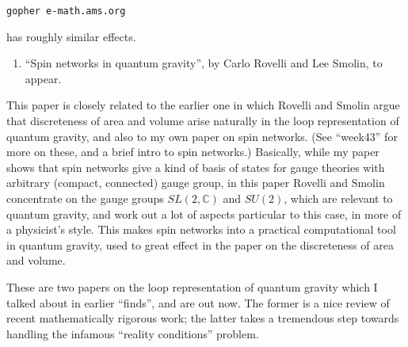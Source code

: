\documentclass{article}
\def\tightlist{}
\renewcommand{\texttt}[1]{%
  \begingroup
  \ttfamily
  \begingroup\lccode`~=`/\lowercase{\endgroup\def~}{/\discretionary{}{}{}}%
  \begingroup\lccode`~=`[\lowercase{\endgroup\def~}{[\discretionary{}{}{}}%
  \begingroup\lccode`~=`.\lowercase{\endgroup\def~}{.\discretionary{}{}{}}%
  \catcode`/=\active\catcode`[=\active\catcode`.=\active
  \scantokens{#1\noexpand}%
  \endgroup
}
\begin{document}
\begin{verbatim}
gopher e-math.ams.org
\end{verbatim}

has roughly similar effects.

\begin{enumerate}
\def\labelenumi{\arabic{enumi})}
\setcounter{enumi}{2}
\tightlist
\item
  ``Spin networks in quantum gravity'', by Carlo Rovelli and Lee Smolin,
  to appear.
\end{enumerate}

This paper is closely related to the earlier one in which Rovelli and
Smolin argue that discreteness of area and volume arise naturally in the
loop representation of quantum gravity, and also to my own paper on spin
networks. (See ``week43'' for more on these, and a brief intro to spin
networks.) Basically, while my paper shows that spin networks give a
kind of basis of states for gauge theories with arbitrary (compact,
connected) gauge group, in this paper Rovelli and Smolin concentrate on
the gauge groups \(SL(2,\mathbb{C})\) and \(SU(2)\), which are relevant
to quantum gravity, and work out a lot of aspects particular to this
case, in more of a physicist's style. This makes spin networks into a
practical computational tool in quantum gravity, used to great effect in
the paper on the discreteness of area and volume.


These are two papers on the loop representation of quantum gravity which
I talked about in earlier ``finds'', and are out now. The former is a
nice review of recent mathematically rigorous work; the latter takes a
tremendous step towards handling the infamous ``reality conditions''
problem.
\end{document}

